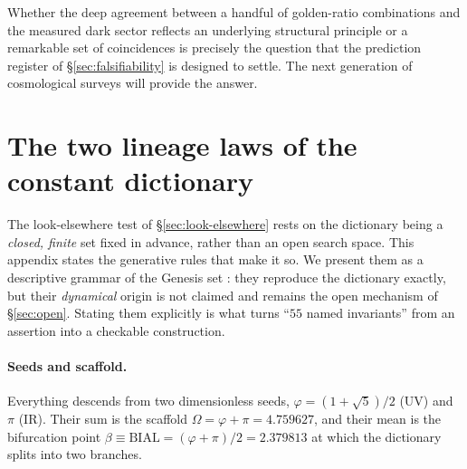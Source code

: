 \documentclass[aps,prd,preprint,amsmath,amssymb,nofootinbib,longbibliography]{revtex4-2}
\begin{document}
Whether the deep agreement between a handful of golden-ratio combinations and
the measured dark sector reflects an underlying structural principle or a
remarkable set of coincidences is precisely the question that the prediction
register of \S\ref{sec:falsifiability} is designed to settle. The next
generation of cosmological surveys will provide the answer.

\appendix
\section{The two lineage laws of the constant dictionary}
\label{app:laws}

The look-elsewhere test of \S\ref{sec:look-elsewhere} rests on the dictionary
being a \emph{closed, finite} set fixed in advance, rather than an open search
space. This appendix states the generative rules that make it so. We present
them as a descriptive grammar of the Genesis set
\citep{AlmeidaSSEE2026genesis}: they reproduce the dictionary exactly, but their
\emph{dynamical} origin is not claimed and remains the open mechanism of
\S\ref{sec:open}. Stating them explicitly is what turns ``$55$ named invariants''
from an assertion into a checkable construction.

\paragraph{Seeds and scaffold.} Everything descends from two dimensionless
seeds, $\varphi=(1+\sqrt5)/2$ (UV) and $\pi$ (IR). Their sum is the scaffold
$\Omega=\varphi+\pi=4.759627$, and their mean is the bifurcation point
$\beta\equiv\mathrm{BIAL}=(\varphi+\pi)/2=2.379813$ at which the dictionary splits
into two branches.
\end{document}
